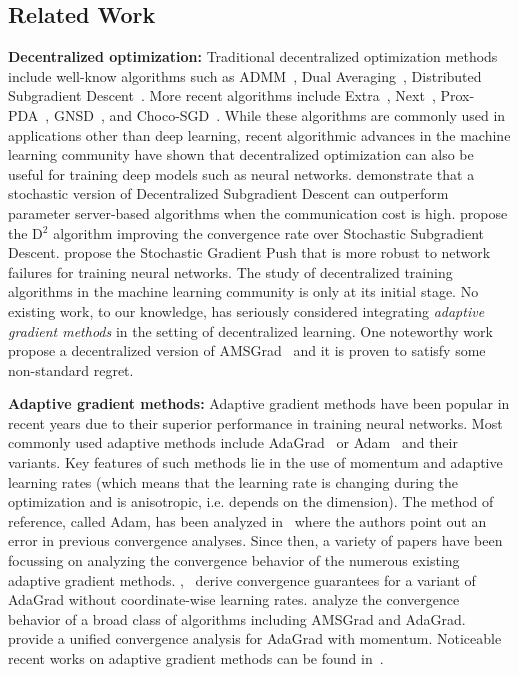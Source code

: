 \documentclass{article} %
\begin{document}
\subsection{Related Work}
\textbf{Decentralized optimization:} 
Traditional decentralized optimization methods include well-know algorithms such as ADMM~\citep{boyd2011distributed}, Dual Averaging~\citep{duchi2011dual}, Distributed Subgradient Descent~\citep{nedic2009distributed}. 
More recent algorithms include Extra~\citep{shi2015extra}, Next~\citep{di2016next}, Prox-PDA~\citep{hong2017prox}, GNSD~\citep{lu2019gnsd}, and Choco-SGD~\citep{koloskova2019decentralized}.  
While these algorithms are commonly used in applications other than deep learning, recent algorithmic advances in the machine learning community have shown that decentralized optimization can also be useful for training deep models such as neural networks. 
\citet{lian2017can} demonstrate that a stochastic version of Decentralized Subgradient Descent can outperform parameter server-based algorithms when the communication cost is high. 
\citet{tang2018d} propose the D$^2$ algorithm improving the convergence rate over Stochastic Subgradient Descent.
\citet{assran2019stochastic} propose the Stochastic Gradient Push that is more robust to network failures for training neural networks. 
The study of decentralized training algorithms in the machine learning community is only at its initial stage. 
No existing work, to our knowledge, has seriously considered integrating \emph{adaptive gradient methods} in the setting of decentralized learning.
One noteworthy work~\citep{nazari2019dadam} propose a decentralized version of AMSGrad~\citep{reddi2019convergence} and it is proven to satisfy some non-standard regret.


\textbf{Adaptive gradient methods:}  
Adaptive gradient methods have been popular in recent years due to their superior performance in training neural networks. 
Most commonly used adaptive methods include AdaGrad~\citep{duchi2011adaptive} or Adam~\citep{kingma2014adam} and their variants.  
Key features of such methods lie in the use of momentum and adaptive learning rates (which means that the learning rate is changing during the optimization and is anisotropic, i.e. depends on the dimension).
The method of reference, called Adam, has been analyzed in~\citet{reddi2019convergence} where the authors point out an error in previous convergence analyses. 
Since then, a variety of papers have been focussing on analyzing the convergence behavior of the numerous existing adaptive gradient methods. 
\citet{ward2019adagrad},~\citet{li2019convergence} derive convergence guarantees for a variant of AdaGrad without coordinate-wise learning rates. 
\citet{chen2018convergence} analyze the convergence behavior of a broad class of algorithms including AMSGrad and AdaGrad. 
\citet{zou2018convergence} provide a unified convergence analysis for AdaGrad with momentum.
Noticeable recent works on adaptive gradient methods can be found in~\citet{agarwal2019efficient,luo2019adaptive,zaheer2018adaptive}.  
\end{document}
